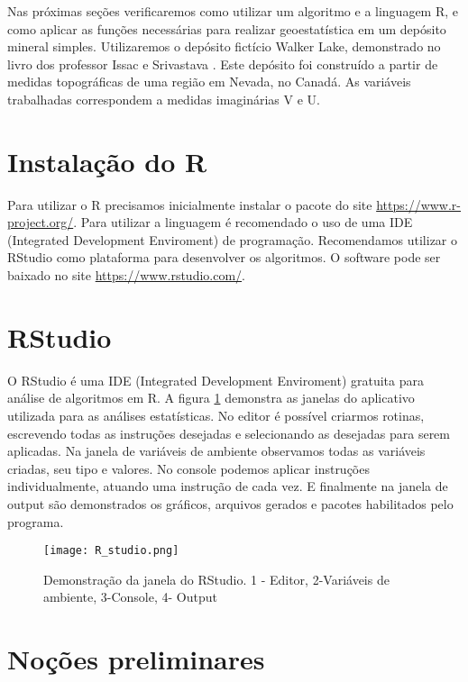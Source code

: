 Nas próximas seções verificaremos como utilizar um algoritmo e a linguagem R, e como aplicar as funções necessárias para realizar geoestatística em um depósito mineral simples. Utilizaremos o depósito fictício Walker Lake, demonstrado no livro dos professor Issac e Srivastava \cite{isaaks1989applied}. Este depósito foi construído a partir de medidas topográficas de uma região em Nevada, no Canadá. As variáveis trabalhadas correspondem a medidas imaginárias V e U.

\section{Instalação do R}

Para utilizar o R precisamos inicialmente instalar o pacote do site \url{https://www.r-project.org/}. Para  utilizar a linguagem é recomendado o uso de uma IDE (Integrated Development Enviroment) de programação. Recomendamos utilizar o RStudio como plataforma para desenvolver os algoritmos. O software pode ser baixado no site \url{https://www.rstudio.com/}. 

\section{RStudio} 

O RStudio é uma IDE (Integrated Development Enviroment) gratuita para análise de algoritmos em R. A figura \ref{RStudio} demonstra as janelas do aplicativo utilizada para as análises estatísticas. No editor é possível criarmos rotinas, escrevendo todas as instruções desejadas e selecionando as desejadas para serem aplicadas. Na janela de variáveis de ambiente observamos todas as variáveis criadas, seu tipo e valores. No console podemos aplicar instruções individualmente, atuando uma instrução de cada vez. E finalmente na janela de output são demonstrados os gráficos, arquivos gerados e pacotes habilitados pelo programa. 

\FloatBarrier
\begin{figure}[H]
	\centering
	\texttt{[image: R\_studio.png]}	
	\caption{Demonstração da janela do RStudio. 1 - Editor,  2-Variáveis de ambiente, 3-Console, 4- Output}
	\label{RStudio}
\end{figure}
\FloatBarrier


\section{Noções preliminares}

